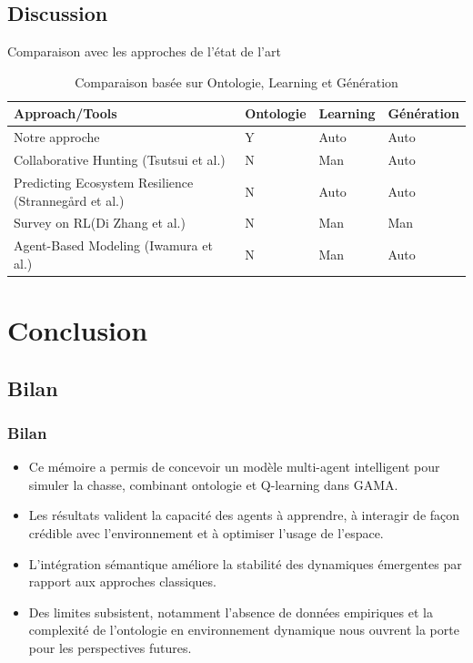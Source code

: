 \documentclass[11pt]{beamer}
\begin{document}
\subsection{Discussion}
\begin{frame}{Comparaison avec les approches de l’état de l’art}
    \begin{table}[H]
        \centering
        \caption{Comparaison basée sur Ontologie, Learning et Génération}
        \begin{tabular}{|p{4.5cm}|p{1.70cm}|p{1.70cm}|p{2cm}|}
            \hline
            \textbf{Approach/Tools} & \textbf{Ontologie} & \textbf{Learning} & \textbf{Génération} \\ \hline
            Notre approche & Y & Auto & Auto \\ \hline
            Collaborative Hunting (Tsutsui et al.) & N & Man & Auto \\ \hline
            Predicting Ecosystem Resilience (Strannegård et al.) & N & Auto & Auto \\ \hline
            Survey on RL(Di Zhang et al.) & N & Man & Man \\ \hline
            Agent-Based Modeling (Iwamura et al.) & N & Man & Auto \\ \hline
        \end{tabular}
        \begin{flushleft}
        \end{flushleft}
    \end{table}
\end{frame}
    
\section{ Conclusion}
\subsection{Bilan}
\begin{frame}
\frametitle{ Bilan}
\begin{itemize}
    \item Ce mémoire a permis de concevoir un modèle multi-agent intelligent pour simuler la chasse, combinant ontologie et Q-learning dans GAMA.
    \item Les résultats valident la capacité des agents à apprendre, à interagir de façon crédible avec l’environnement et à optimiser l’usage de l’espace.
    \item L’intégration sémantique améliore la stabilité des dynamiques émergentes par rapport aux approches classiques.
    \item Des limites subsistent, notamment l’absence de données empiriques et la complexité de l’ontologie en environnement dynamique nous ouvrent la porte pour les perspectives futures. 
\end{itemize}
\end{frame}
\end{document}
